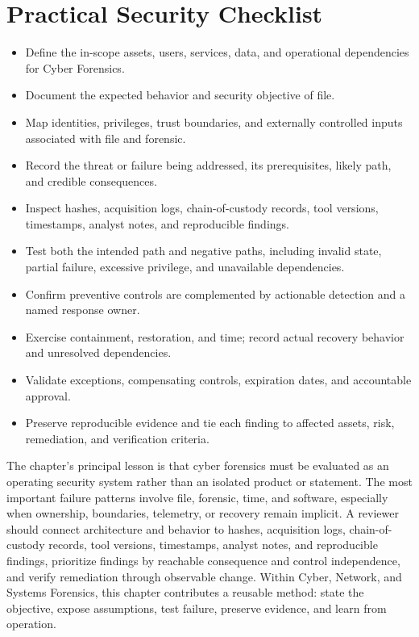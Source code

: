 \documentclass[11pt]{article}
\begin{document}
\section*{Practical Security Checklist}
\begin{itemize}[label=$\square$]
\item Define the in-scope assets, users, services, data, and operational dependencies for Cyber Forensics.
\item Document the expected behavior and security objective of file.
\item Map identities, privileges, trust boundaries, and externally controlled inputs associated with file and forensic.
\item Record the threat or failure being addressed, its prerequisites, likely path, and credible consequences.
\item Inspect hashes, acquisition logs, chain-of-custody records, tool versions, timestamps, analyst notes, and reproducible findings.
\item Test both the intended path and negative paths, including invalid state, partial failure, excessive privilege, and unavailable dependencies.
\item Confirm preventive controls are complemented by actionable detection and a named response owner.
\item Exercise containment, restoration, and time; record actual recovery behavior and unresolved dependencies.
\item Validate exceptions, compensating controls, expiration dates, and accountable approval.
\item Preserve reproducible evidence and tie each finding to affected assets, risk, remediation, and verification criteria.
\end{itemize}
\begin{synthesisbox}
The chapter's principal lesson is that cyber forensics must be evaluated as an operating security system rather than an isolated product or statement. The most important failure patterns involve file, forensic, time, and software, especially when ownership, boundaries, telemetry, or recovery remain implicit. A reviewer should connect architecture and behavior to hashes, acquisition logs, chain-of-custody records, tool versions, timestamps, analyst notes, and reproducible findings, prioritize findings by reachable consequence and control independence, and verify remediation through observable change. Within Cyber, Network, and Systems Forensics, this chapter contributes a reusable method: state the objective, expose assumptions, test failure, preserve evidence, and learn from operation.
\end{synthesisbox}
\end{document}
